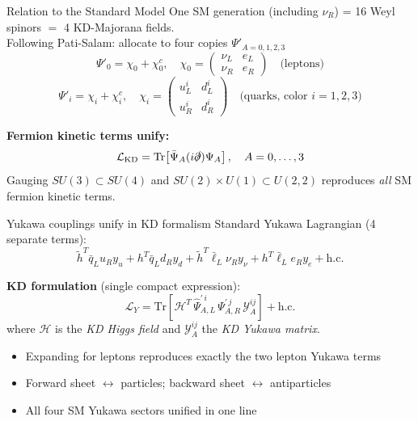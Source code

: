 \documentclass[aspectratio=169]{beamer}
\newcommand{\Blue}[1]{{\color{cptblue}#1}}
\begin{document}
\begin{frame}{Relation to the Standard Model}
  One SM generation (including $\nu_R$) = 16 Weyl spinors
  $=$ 4 KD-Majorana fields.\\[0.4em]
  Following Pati-Salam: allocate to four copies $\Psi'_{A=0,1,2,3}$
  \[
    \Psi'_0 = \chi_0 + \chi_0^c,\quad
    \chi_0 = \begin{pmatrix}\nu_L & e_L \\ \nu_R & e_R\end{pmatrix}
    \quad\text{(leptons)}
  \]
  \[
    \Psi'_i = \chi_i + \chi_i^c,\quad
    \chi_i = \begin{pmatrix}u_L^i & d_L^i \\ u_R^i & d_R^i\end{pmatrix}
    \quad\text{(quarks, color }i=1,2,3)
  \]

  \vspace{0.3em}
  \textbf{Fermion kinetic terms unify:}
  \[
    \mathcal{L}_\text{KD} = \mathrm{Tr}\!\left[\bar\Psi_A(i\slashed\partial)\Psi_A\right],\quad A=0,\ldots,3
  \]
  Gauging $SU(3)\subset SU(4)$ and $SU(2)\times U(1)\subset U(2,2)$
  reproduces \emph{all} SM fermion kinetic terms.
\end{frame}

\begin{frame}{Yukawa couplings unify in KD formalism}
  Standard Yukawa Lagrangian (4 separate terms):
  \[
    \tilde h^T\bar q_L u_R y_u + h^T\bar q_L d_R y_d
    + \tilde h^T\bar\ell_L \nu_R y_\nu + h^T\bar\ell_L e_R y_e
    + \text{h.c.}
  \]

  \vspace{0.3em}
  \textbf{KD formulation} (single compact expression):
  \[
    \mathcal{L}_Y = \mathrm{Tr}\!\left[
      \mathcal{H}^T\,\widehat\Psi_{A,L}^{\prime\,i}\,\Psi_{A,R}^{\prime\,j}\,
      \mathcal{Y}_A^{ij}
    \right] + \text{h.c.}
  \]
  where $\mathcal{H}$ is the \emph{KD Higgs field} and
  $\mathcal{Y}_A^{ij}$ the \emph{KD Yukawa matrix}.

  \vspace{0.4em}
  \begin{itemize}
    \item Expanding for leptons reproduces exactly the two lepton Yukawa terms
    \item Forward sheet $\leftrightarrow$ particles; backward sheet $\leftrightarrow$ antiparticles
    \item \Blue{All four SM Yukawa sectors unified in one line}
  \end{itemize}
\end{frame}
\end{document}
